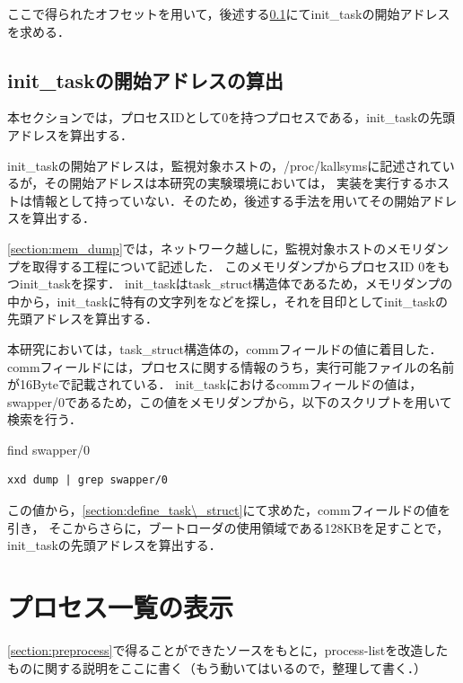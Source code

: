 ここで得られたオフセットを用いて，後述する\ref{subsection:find_init_task}にてinit_taskの開始アドレスを求める．

\subsection{init_taskの開始アドレスの算出}
\label{subsection:find_init_task}

本セクションでは，プロセスIDとして0を持つプロセスである，init_taskの先頭アドレスを算出する．

init_taskの開始アドレスは，監視対象ホストの，/proc/kallsymsに記述されているが，その開始アドレスは本研究の実験環境においては，
実装を実行するホストは情報として持っていない．そのため，後述する手法を用いてその開始アドレスを算出する．

\ref{section:mem_dump}では，ネットワーク越しに，監視対象ホストのメモリダンプを取得する工程について記述した．
このメモリダンプからプロセスID 0をもつinit_taskを探す．
init_taskはtask\_struct構造体であるため，メモリダンプの中から，init_taskに特有の文字列をなどを探し，それを目印としてinit_taskの先頭アドレスを算出する．

本研究においては，task\_struct構造体の，commフィールドの値に着目した．
commフィールドには，プロセスに関する情報のうち，実行可能ファイルの名前が16Byteで記載されている．
init_taskにおけるcommフィールドの値は，swapper/0であるため，この値をメモリダンプから，以下のスクリプトを用いて検索を行う．

\begin{itembox}[l]{find swapper/0}
    \begin{verbatim}
xxd dump | grep swapper/0
    \end{verbatim}
\end{itembox}

この値から，\ref{section:define_task\_struct}にて求めた，commフィールドの値を引き，
そこからさらに，ブートローダの使用領域である128KBを足すことで，init_taskの先頭アドレスを算出する．



\section{プロセス一覧の表示}
\label{subsection:process-list}

\ref{section:preprocess}で得ることができたソースをもとに，process-listを改造したものに関する説明をここに書く（もう動いてはいるので，整理して書く．）

